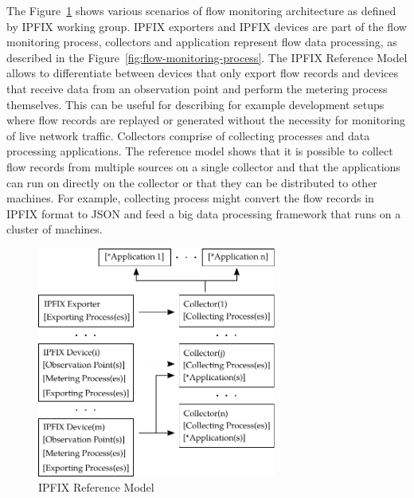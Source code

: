 The Figure~\ref{fig:ipfix_reference_model} shows various scenarios of flow monitoring architecture as defined by IPFIX working group. IPFIX exporters and IPFIX devices are part of the flow monitoring process, collectors and application represent flow data processing, as described in the Figure~\ref{fig:flow-monitoring-process}. The IPFIX Reference Model allows to differentiate between devices that only export flow records and devices that receive data from an observation point and perform the metering process themselves. This can be useful for describing for example development setups where flow records are replayed or generated without the necessity for monitoring of live network traffic. Collectors comprise of collecting processes and data processing applications. The reference model shows that it is possible to collect flow records from multiple sources on a single collector and that the applications can run on directly on the collector or that they can be distributed to other machines. For example, collecting process might convert the flow records in IPFIX format to JSON and feed a big data processing framework that runs on a cluster of machines.

\begin{figure}[t!]
  \begin{center}
    \includegraphics[width=0.7\textwidth]{figures/ipfix-reference-model}
  \end{center}
  \caption{IPFIX Reference Model~\cite{rfc5470}}
  \label{fig:ipfix_reference_model}
\end{figure}


